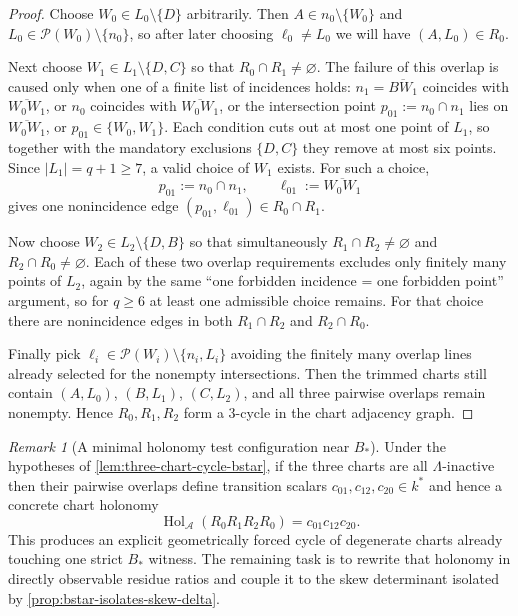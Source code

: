 \documentclass[11pt]{amsart}
\numberwithin{equation}{section}
\theoremstyle{plain}
\theoremstyle{definition}
\theoremstyle{remark}
\newtheorem{remark}[theorem]{Remark}
\newcommand{\Lam}{\Lambda}
\begin{document}
\begin{proof}
Choose $W_0\in L_0\setminus\{D\}$ arbitrarily. Then $A\in n_0\setminus\{W_0\}$ and $L_0\in \mathcal P(W_0)\setminus\{n_0\}$,
so after later choosing $\ell_0\neq L_0$ we will have $(A,L_0)\in R_0$.

Next choose $W_1\in L_1\setminus\{D,C\}$ so that $R_0\cap R_1\neq\varnothing$. The failure of this overlap is caused only when one of a
finite list of incidences holds: $n_1=\overline{BW_1}$ coincides with $\overline{W_0W_1}$, or $n_0$ coincides with $\overline{W_0W_1}$, or the
intersection point $p_{01}:=n_0\cap n_1$ lies on $\overline{W_0W_1}$, or $p_{01}\in\{W_0,W_1\}$. Each condition cuts out at most one point of
$L_1$, so together with the mandatory exclusions $\{D,C\}$ they remove at most six points. Since $|L_1|=q+1\ge 7$, a valid choice of $W_1$
exists. For such a choice,
\[
p_{01}:=n_0\cap n_1,
\qquad
\ell_{01}:=\overline{W_0W_1}
\]
gives one nonincidence edge $(p_{01},\ell_{01})\in R_0\cap R_1$.

Now choose $W_2\in L_2\setminus\{D,B\}$ so that simultaneously $R_1\cap R_2\neq\varnothing$ and $R_2\cap R_0\neq\varnothing$. Each of these
two overlap requirements excludes only finitely many points of $L_2$, again by the same ``one forbidden incidence = one forbidden point''
argument, so for $q\ge 6$ at least one admissible choice remains. For that choice there are nonincidence edges in both $R_1\cap R_2$ and
$R_2\cap R_0$.

Finally pick $\ell_i\in \mathcal P(W_i)\setminus\{n_i,L_i\}$ avoiding the finitely many overlap lines already selected for the nonempty
intersections. Then the trimmed charts still contain $(A,L_0)$, $(B,L_1)$, $(C,L_2)$, and all three pairwise overlaps remain nonempty. Hence
$R_0,R_1,R_2$ form a $3$-cycle in the chart adjacency graph.
\end{proof}

\begin{remark}[A minimal holonomy test configuration near $B_*$]
\label{rem:three-chart-cycle-holonomy-lab}
Under the hypotheses of \cref{lem:three-chart-cycle-bstar}, if the three charts are all $\Lam$-inactive then their pairwise overlaps define
transition scalars $c_{01},c_{12},c_{20}\in k^*$ and hence a concrete chart holonomy
\[
\operatorname{Hol}_{\mathcal A}(R_0R_1R_2R_0)=c_{01}c_{12}c_{20}.
\]
This produces an explicit geometrically forced cycle of degenerate charts already touching one strict $B_*$ witness. The remaining task
is to rewrite that holonomy in directly observable residue ratios and couple it to the skew determinant isolated by
\cref{prop:bstar-isolates-skew-delta}.
\end{remark}
\end{document}
